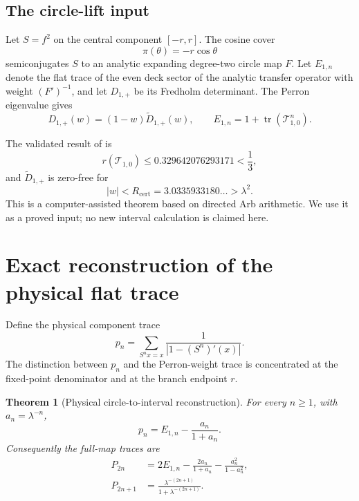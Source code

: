 \documentclass[11pt]{article}
\newtheorem{theorem}{Theorem}[section]
\theoremstyle{definition}
\theoremstyle{remark}
\newcommand{\cT}{\mathcal T}
\begin{document}
\subsection{The circle-lift input}

Let $S=f^2$ on the central component $[-r,r]$.  The cosine cover
\begin{equation}\label{eq:cosine-cover}
 \pi(\theta)=-r\cos\theta
\end{equation}
semiconjugates $S$ to an analytic expanding degree-two circle map $F$.
Let $E_{1,n}$ denote the flat trace of the even deck sector of the analytic
transfer operator with weight $(F')^{-1}$, and let $D_{1,+}$ be its Fredholm
determinant.  The Perron eigenvalue gives
\begin{equation}\label{eq:perron-deflation}
 D_{1,+}(w)=(1-w)\widetilde D_{1,+}(w),
 \qquad
 E_{1,n}=1+\operatorname{tr}(\cT_{1,0}^n).
\end{equation}

The validated result of \citet{WangValidatedGap2026} is
\begin{equation}\label{eq:validated-radius}
 r(\cT_{1,0})
 \le0.329642076293171<\frac13,
\end{equation}
and $\widetilde D_{1,+}$ is zero-free for
\begin{equation}\label{eq:certified-disk}
 |w|<R_{\mathrm{cert}}=3.0335933180\ldots>\lambda^2.
\end{equation}
This is a computer-assisted theorem based on directed Arb arithmetic.  We use
it as a proved input; no new interval calculation is claimed here.

\section{Exact reconstruction of the physical flat trace}
\label{sec:trace-reconstruction}

Define the physical component trace
\begin{equation}\label{eq:component-physical}
 p_n=\sum_{S^nx=x}\frac1{|1-(S^n)'(x)|}.
\end{equation}
The distinction between $p_n$ and the Perron-weight trace is concentrated at
the fixed-point denominator and at the branch endpoint $r$.

\begin{theorem}[Physical circle-to-interval reconstruction]
\label{thm:physical-reconstruction}
For every $n\ge1$, with $a_n=\lambda^{-n}$,
\begin{equation}\label{eq:component-reconstruction}
 \boxed{
 p_n=E_{1,n}-\frac{a_n}{1+a_n}.}
\end{equation}
Consequently the full-map traces are
\begin{align}
 P_{2n}
 &=2E_{1,n}
 -\frac{2a_n}{1+a_n}
 -\frac{a_n^2}{1-a_n^2},
 \label{eq:even-reconstruction}\\
 P_{2n+1}
 &=\frac{\lambda^{-(2n+1)}}{1+\lambda^{-(2n+1)}}.
 \label{eq:odd-reconstruction}
\end{align}
\end{theorem}
\end{document}

